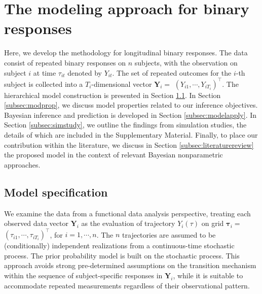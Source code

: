 
%
\section{The modeling approach for binary responses}
\label{sec:binarymodel}


Here, we develop the methodology for longitudinal binary responses.
The data consist of repeated binary responses on $n$ subjects, 
with the observation on subject $i$ at time $\tau_{it}$ denoted by $Y_{it}$. The set of 
repeated outcomes for the $i$-th subject is collected into a $T_i$-dimensional vector 
$\mathbf{Y}_i=$ $(Y_{i1},\cdots,Y_{iT_i})^\top$. The hierarchical model construction 
is presented in Section \ref{subsec:standardmodel}. In Section \ref{subsec:modprop}, 
we discuss model properties related to our inference objectives. Bayesian inference and 
prediction is developed in Section \ref{subsec:modelapply}. In Section \ref{subsec:simstudy},
we outline the findings from simulation studies, the details of which are included in 
the Supplementary Material. Finally, to place our contribution within the literature, we 
discuss in Section \ref{subsec:literaturereview} the proposed model in the context of 
relevant Bayesian nonparametric approaches.


\subsection{Model specification}
\label{subsec:standardmodel}

We examine the data from a functional data analysis perspective, treating each observed 
data vector $\mathbf{Y}_i$ as the evaluation of trajectory $Y_i(\tau)$ on grid 
$\boldsymbol{\tau}_i=$ $(\tau_{i1},\cdots,\tau_{iT_i})^{\top}$, for $i=1,\cdots,n$. 
The $n$ trajectories are assumed to be (conditionally) independent realizations from 
a continuous-time stochastic process. The prior probability model is built on the stochastic 
process. This approach avoids strong pre-determined assumptions on the transition 
mechanism within the sequence of subject-specific responses in $\mathbf{Y}_i$, while it 
is suitable to accommodate repeated measurements regardless of their observational pattern.  


